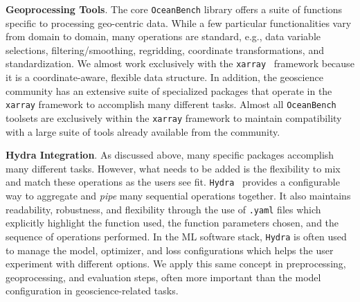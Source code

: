 \textbf{Geoprocessing Tools}. 
The core \texttt{OceanBench} library offers a suite of functions specific to processing geo-centric data. 
While a few particular functionalities vary from domain to domain, many operations are standard, e.g., data variable selections, filtering/smoothing, regridding, coordinate transformations, and standardization. 
We almost work exclusively with the \texttt{xarray}~\cite{XARRAY} framework because it is a coordinate-aware, flexible data structure. 
In addition, the geoscience community has an extensive suite of specialized packages that operate in the \texttt{xarray} framework to accomplish many different tasks. 
Almost all \texttt{OceanBench} toolsets are exclusively within the \texttt{xarray} framework to maintain compatibility with a large suite of tools already available from the community.




\textbf{Hydra Integration}. 
As discussed above, many specific packages accomplish many different tasks. 
However, what needs to be added is the flexibility to mix and match these operations as the users see fit. 
\texttt{Hydra}~\cite{Hydra} provides a configurable way to aggregate and \textit{pipe} many sequential operations together. 
It also maintains readability, robustness, and flexibility through the use of \texttt{.yaml} files which explicitly highlight the function used, the function parameters chosen, and the sequence of operations performed. 
In the ML software stack, \texttt{Hydra} is often used to manage the model, optimizer, and loss configurations which helps the user experiment with different options. 
We apply this same concept in preprocessing, geoprocessing, and evaluation steps, often more important than the model configuration in geoscience-related tasks.  

